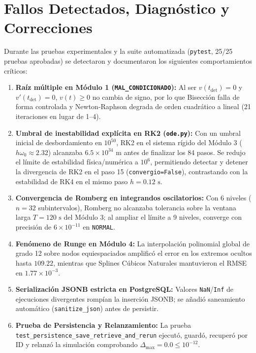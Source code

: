 \documentclass[11pt,a4paper]{article}
\begin{document}
\section{Fallos Detectados, Diagnóstico y Correcciones}
Durante las pruebas experimentales y la suite automatizada (\texttt{pytest}, 25/25 pruebas aprobadas) se detectaron y documentaron los siguientes comportamientos críticos:
\begin{enumerate}
    \item \textbf{Raíz múltiple en Módulo 1 (\texttt{MAL\_CONDICIONADO}):} Al ser $v(t_{\text{det}})=0$ y $v'(t_{\text{det}})=0$, $v(t)\ge 0$ no cambia de signo, por lo que Bisección falla de forma controlada y Newton-Raphson degrada de orden cuadrático a lineal (21 iteraciones en lugar de 1--4).
    \item \textbf{Umbral de inestabilidad explícita en RK2 (\texttt{ode.py}):} Con un umbral inicial de desbordamiento en $10^{50}$, RK2 en el sistema rígido del Módulo 3 ($h\omega_0 \approx 2.32$) alcanzaba $6.5\times 10^{34}\text{ m}$ antes de finalizar los 84 pasos. Se redujo el límite de estabilidad física/numérica a $10^6$, permitiendo detectar y detener la divergencia de RK2 en el paso 15 (\texttt{convergio=False}), contrastando con la estabilidad de RK4 en el mismo paso $h=0.12\text{ s}$.
    \item \textbf{Convergencia de Romberg en integrandos oscilatorios:} Con 6 niveles ($n=32$ subintervalos), Romberg no alcanzaba tolerancia sobre la ventana larga $T=120\text{ s}$ del Módulo 3; al ampliar el límite a 9 niveles, converge con precisión de $6\times 10^{-11}$ en \texttt{NORMAL}.
    \item \textbf{Fenómeno de Runge en Módulo 4:} La interpolación polinomial global de grado 12 sobre nodos equiespaciados amplificó el error en los extremos ocultos hasta $109.22$, mientras que Splines Cúbicos Naturales mantuvieron el RMSE en $1.77\times 10^{-3}$.
    \item \textbf{Serialización JSONB estricta en PostgreSQL:} Valores \texttt{NaN}/\texttt{Inf} de ejecuciones divergentes rompían la inserción JSONB; se añadió saneamiento automático (\texttt{sanitize\_json}) antes de persistir.
    \item \textbf{Prueba de Persistencia y Relanzamiento:} La prueba \texttt{test\_persistence\_save\_retrieve\_and\_rerun} ejecutó, guardó, recuperó por ID y relanzó la simulación comprobando $\Delta_{\max} = 0.0 \le 10^{-12}$.
\end{enumerate}
\end{document}
